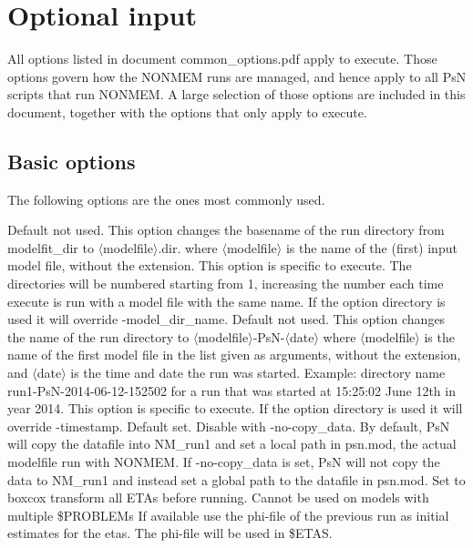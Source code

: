 \section{Optional input}
All options listed in document common\_options.pdf apply to 
execute. 
Those options govern how the NONMEM runs are managed, 
and hence apply to all PsN scripts that run NONMEM. 
A large selection of those options are included in this document,
together with the options that only apply to execute.

\renewcommand{\guidetoolname}{modelfit}
\subsection{Basic options}
The following options are the ones most commonly used.

\renewcommand{\guidetoolname}{execute}

\begin{optionlist}
Default not used. 
This option changes the basename of the run directory from modelfit\_dir 
to $\langle$modelfile$\rangle$.dir. where $\langle$modelfile$\rangle$ 
is the name of the (first) input model file, without the extension. 
This option is specific to execute.
The directories will be numbered starting from 1, increasing the number each time execute is run with a model file with the 
same name. If the option directory is used it will override -model\_dir\_name.
\nextopt
{}
Default not used. This option changes the name of the run directory to $\langle$modelfile$\rangle$-PsN-$\langle$date$\rangle$
where $\langle$modelfile$\rangle$ is the name of the first model file in the list given as arguments, without the extension,
and $\langle$date$\rangle$ is the time and date the run was started. 
Example: directory name run1-PsN-2014-06-12-152502 for a run that was started at 15:25:02 June 12th in year 2014.
This option is specific to execute.
If the option directory is used it will override -timestamp.
\nextopt
{}
Default set. Disable with -no-copy\_data. By default, PsN will copy the datafile into NM\_run1 and set a local path in psn.mod, the actual modelfile run with NONMEM. If -no-copy\_data is set, PsN will not copy the data to NM\_run1 and instead set a global path to the datafile in psn.mod.
\nextopt
        Set to boxcox transform all ETAs before running. Cannot be used
        on models with multiple \$PROBLEMs
    \nextopt
        If available use the phi-file of the previous run as initial estimates
        for the etas. The phi-file will be used in \$ETAS.
    \nextopt
\end{optionlist}

